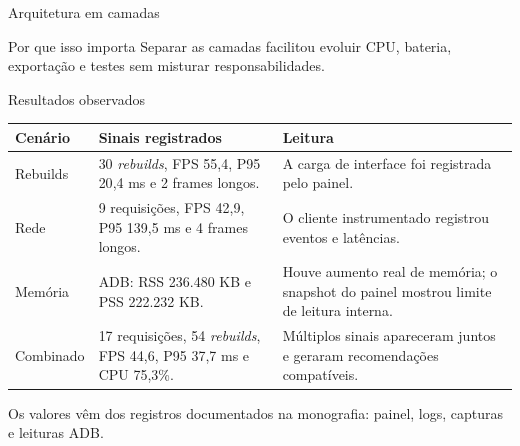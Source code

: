 \documentclass[aspectratio=169,10pt]{beamer}
\newcommand{\smallref}[1]{\textcolor{collectorTeal}{\scriptsize #1}}
\begin{document}
\begin{frame}{Arquitetura em camadas}
\centering
{}
\vspace{4mm}
\begin{accentbox}[width=0.88\textwidth]{Por que isso importa}
Separar as camadas facilitou evoluir CPU, bateria, exportação e testes sem misturar responsabilidades.
\end{accentbox}
\end{frame}

\begin{frame}{Resultados observados}
\footnotesize
\begin{tabularx}{\textwidth}{L{2.6cm}Y Y}
\toprule
\textbf{Cenário} & \textbf{Sinais registrados} & \textbf{Leitura} \\
\midrule
Rebuilds & 30 \textit{rebuilds}, FPS 55{,}4, P95 20{,}4 ms e 2 frames longos. & A carga de interface foi registrada pelo painel. \\
Rede & 9 requisições, FPS 42{,}9, P95 139{,}5 ms e 4 frames longos. & O cliente instrumentado registrou eventos e latências. \\
Memória & ADB: RSS 236.480 KB e PSS 222.232 KB. & Houve aumento real de memória; o snapshot do painel mostrou limite de leitura interna. \\
Combinado & 17 requisições, 54 \textit{rebuilds}, FPS 44{,}6, P95 37{,}7 ms e CPU 75{,}3\%. & Múltiplos sinais apareceram juntos e geraram recomendações compatíveis. \\
\bottomrule
\end{tabularx}
\vspace{2mm}
\smallref{Os valores vêm dos registros documentados na monografia: painel, logs, capturas e leituras ADB.}
\end{frame}
\end{document}
